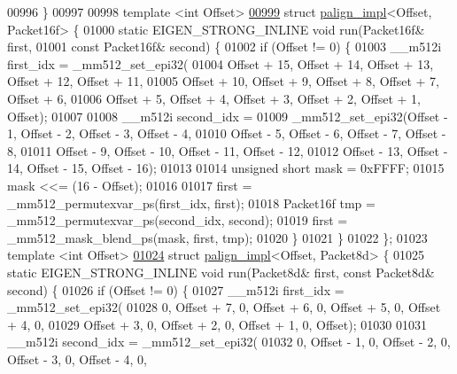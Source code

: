 \begin{DoxyCode}
00996 \}
00997 
00998 \textcolor{keyword}{template} <\textcolor{keywordtype}{int} Offset>
\hyperlink{struct_eigen_1_1internal_1_1palign__impl_3_01_offset_00_01_packet16f_01_4}{00999} \textcolor{keyword}{struct }\hyperlink{struct_eigen_1_1internal_1_1palign__impl}{palign\_impl}<Offset, Packet16f> \{
01000   \textcolor{keyword}{static} EIGEN\_STRONG\_INLINE \textcolor{keywordtype}{void} run(Packet16f& first,
01001                                       \textcolor{keyword}{const} Packet16f& second) \{
01002     \textcolor{keywordflow}{if} (Offset != 0) \{
01003       \_\_m512i first\_idx = \_mm512\_set\_epi32(
01004           Offset + 15, Offset + 14, Offset + 13, Offset + 12, Offset + 11,
01005           Offset + 10, Offset + 9, Offset + 8, Offset + 7, Offset + 6,
01006           Offset + 5, Offset + 4, Offset + 3, Offset + 2, Offset + 1, Offset);
01007 
01008       \_\_m512i second\_idx =
01009           \_mm512\_set\_epi32(Offset - 1, Offset - 2, Offset - 3, Offset - 4,
01010                            Offset - 5, Offset - 6, Offset - 7, Offset - 8,
01011                            Offset - 9, Offset - 10, Offset - 11, Offset - 12,
01012                            Offset - 13, Offset - 14, Offset - 15, Offset - 16);
01013 
01014       \textcolor{keywordtype}{unsigned} \textcolor{keywordtype}{short} mask = 0xFFFF;
01015       mask <<= (16 - Offset);
01016 
01017       first = \_mm512\_permutexvar\_ps(first\_idx, first);
01018       Packet16f tmp = \_mm512\_permutexvar\_ps(second\_idx, second);
01019       first = \_mm512\_mask\_blend\_ps(mask, first, tmp);
01020     \}
01021   \}
01022 \};
01023 \textcolor{keyword}{template} <\textcolor{keywordtype}{int} Offset>
\hyperlink{struct_eigen_1_1internal_1_1palign__impl_3_01_offset_00_01_packet8d_01_4}{01024} \textcolor{keyword}{struct }\hyperlink{struct_eigen_1_1internal_1_1palign__impl}{palign\_impl}<Offset, Packet8d> \{
01025   \textcolor{keyword}{static} EIGEN\_STRONG\_INLINE \textcolor{keywordtype}{void} run(Packet8d& first, \textcolor{keyword}{const} Packet8d& second) \{
01026     \textcolor{keywordflow}{if} (Offset != 0) \{
01027       \_\_m512i first\_idx = \_mm512\_set\_epi32(
01028           0, Offset + 7, 0, Offset + 6, 0, Offset + 5, 0, Offset + 4, 0,
01029           Offset + 3, 0, Offset + 2, 0, Offset + 1, 0, Offset);
01030 
01031       \_\_m512i second\_idx = \_mm512\_set\_epi32(
01032           0, Offset - 1, 0, Offset - 2, 0, Offset - 3, 0, Offset - 4, 0,

\end{DoxyCode}

